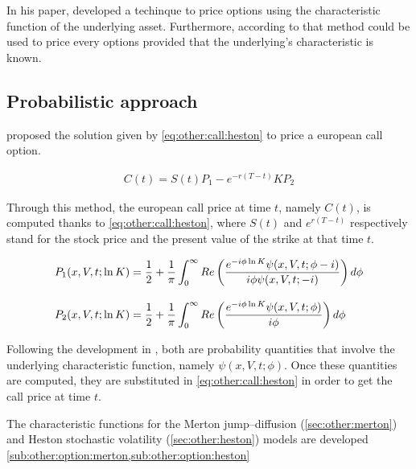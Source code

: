 \documentclass[12pt]{report}
\begin{document}
In his paper, \citet{heston1993} developed a techinque to price options using the characteristic function of the underlying asset. Furthermore, according to \citet{criso2015} that method could be used to price every options provided that the underlying's characteristic  is known.


\subsection{Probabilistic approach}
\label{sub:other:option:probabilistic}

\citet{heston1993} proposed the solution given by \cref{eq:other:call:heston} to price a european call option.

\begin{align}
  C(t) = S(t) P_1 - e^{-r(T-t)} K P_2 \label{eq:other:call:heston}
\end{align}

Through this method, the european call price at time $t$, namely $C(t)$, is computed thanks to \cref{eq:other:call:heston}, where $S(t)$ and $e^{r(T - t)}$ respectively stand for the stock price and the present value of the strike at that time $t$.

\begin{align}
  P_1(x,V,t;\ln{K}) &= \frac{1}{2} + \frac{1}{\pi} \int_0^{\infty} Re \left( \frac{e^{-i\phi\ln{K}} \psi(x,V,t;\phi - i)}{i\phi\psi(x,V,t;-i)} \right) d\phi \label{eq:other:call:heston:pi1} \\ 
  \intertext{}
  P_2(x,V,t;\ln{K}) &= \frac{1}{2} + \frac{1}{\pi} \int_0^{\infty} Re \left( \frac{e^{-i\phi\ln{K}} \psi(x,V,t;\phi)}{i\phi} \right) d\phi \label{eq:other:call:heston:pi2}
\end{align}

Following the development in \citet{criso2015},  both are probability quantities that involve the underlying characteristic function, namely $\psi(x,V,t;\phi)$. Once these quantities are computed, they are substituted in \cref{eq:other:call:heston} in order to get the call price at time $t$.

The characteristic functions for the Merton jump--diffusion (\cref{sec:other:merton}) and Heston stochastic volatility (\cref{sec:other:heston}) models are developed \cref{sub:other:option:merton,sub:other:option:heston}
\end{document}
